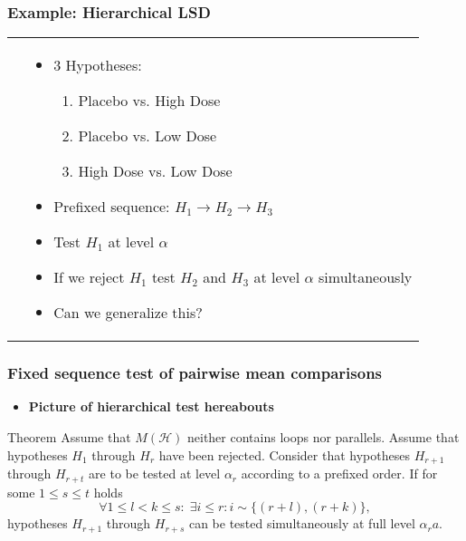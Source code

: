 \documentclass[bigger]{beamer}
\begin{document}
\begin{frame}
  \frametitle{Example: Hierarchical LSD}
\begin{tabular}{ll}
  \begin{minipage}{.4\textwidth}
    
  \end{minipage} &
  \begin{minipage}{.6\textwidth}
    \begin{itemize}
    \item 3 Hypotheses:
      \begin{enumerate}
      \item Placebo vs. High Dose
      \item Placebo vs. Low Dose
      \item High Dose vs. Low Dose
      \end{enumerate}
    \item Prefixed sequence: $H_1 \rightarrow H_2 \rightarrow H_3$
    \item Test $H_1$ at level $\alpha$
    \item If we reject $H_1$ test $H_2$ and $H_3$ at level $\alpha$
      simultaneously
    \item Can we generalize this?
    \end{itemize}
  \end{minipage}
\end{tabular}

\end{frame}

\begin{frame}
  \frametitle{Fixed sequence test of pairwise mean comparisons}
\begin{itemize}
\item {\bf Picture of hierarchical test hereabouts}
\end{itemize}

\begin{block}{Theorem}
  Assume that $M(\mathscr{H})$ neither contains loops nor
  parallels. Assume that hypotheses $H_1$ through $H_r$ have been
  rejected. Consider that hypotheses $H_{r+1}$ through $H_{r+t}$ are
  to be tested at level $\alpha_r$ according to a prefixed order.  If
  for some $1 \leq s \leq t$ holds
  \begin{equation}
    \label{eq:cond.hierarchical}
    \forall 1 \leq l < k \leq s: \; \exists i \leq r: i \sim \{(r+l),(r+k)\},
  \end{equation}
  hypotheses $H_{r+1}$ through $H_{r+s}$ can be tested simultaneously
  at full level $\alpha_ra$.
\end{block}

\end{frame}
\end{document}
